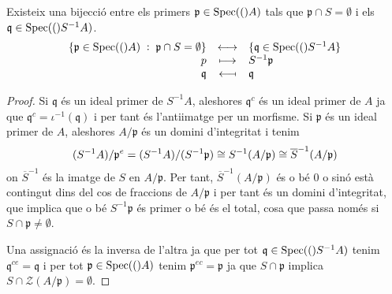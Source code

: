\documentclass[../../../main.tex]{subfiles}
\begin{document}
\begin{ter}
\label{ter:correspondenciaBijectivaContraccioExtensio} Existeix una bijecció entre els primers $\mathfrak{p}\in\mathrm{Spec}(()A)$ tals que $\mathfrak{p}\cap S = \emptyset$ i els $\mathfrak{q}\in \mathrm{Spec}(()S^{-1}A)$.
\begin{equation}
    \notag
    \begin{array}{rcl}
        \{\mathfrak{p}\in\mathrm{Spec}(()A)\;:\;\mathfrak{p}\cap S = \emptyset\} & \longleftrightarrow & \{\mathfrak{q}\in\mathrm{Spec}(()S^{-1}A\} \\
        p & \longmapsto & S^{-1}\mathfrak{p} \\
        \mathfrak{q} & \longmapsfrom & \mathfrak{q}
    \end{array}
\end{equation}
\end{ter}
\begin{proof}
Si $\mathfrak{q}$ és un ideal primer de $S^{-1}A$, aleshores $\mathfrak{q}^c$ és un ideal primer de $A$ ja que $\mathfrak{q}^c = \iota^{-1}(\mathfrak{q})$ i per tant és l'antiimatge per un morfisme. Si $\mathfrak{p}$ és un ideal primer de $A$, aleshores $A/\mathfrak{p}$ és un domini d'integritat i tenim
\begin{equation}
    \notag
    (S^{-1}A)/\mathfrak{p}^{e} = (S^{-1}A)/(S^{-1}\mathfrak{p})\cong S^{-1}(A/\mathfrak{p})\cong\overline{S}^{-1}(A/\mathfrak{p})
\end{equation}
on $\overline{S}^{-1}$ és la imatge de $S$ en $A/\mathfrak{p}$. Per tant, $\overline{S}^{-1}(A/\mathfrak{p})$ és o bé 0 o sinó està contingut dins del cos de fraccions de $A/\mathfrak{p}$ i per tant és un domini d'integritat, que implica que o bé $S^{-1}\mathfrak{p}$ és primer o bé és el total, cosa que passa només si $S\cap \mathfrak{p}\not =\emptyset$.

Una assignació és la inversa de l'altra ja que per tot $\mathfrak{q}\in\mathrm{Spec}(()S^{-1}A)$ tenim $\mathfrak{q}^{ce} = \mathfrak{q}$ i per tot $\mathfrak{p}\in\mathrm{Spec}(()A)$ tenim $\mathfrak{p}^{ec} = \mathfrak{p}$ ja que $S\cap \mathfrak{p}$ implica $S\cap\mathcal{Z}(A/\mathfrak{p}) = \emptyset$.
\end{proof}
\end{document}
